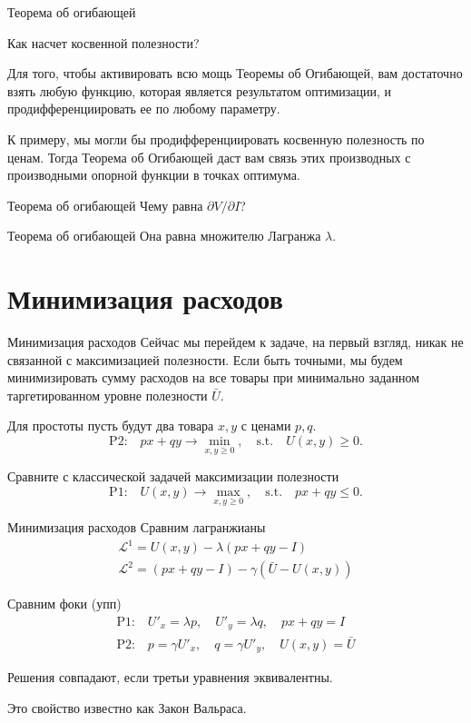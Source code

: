 \documentclass{beamer}
\begin{document}
\begin{frame}{Теорема об огибающей}

Как насчет косвенной полезности?

Для того, чтобы активировать всю мощь Теоремы об Огибающей, вам достаточно взять любую функцию, которая является результатом оптимизации, и продифференциировать ее по любому параметру.

К примеру, мы могли бы продифференциировать косвенную полезность по ценам. Тогда Теорема об Огибающей даст вам связь этих производных с производными опорной функции в точках оптимума.

\end{frame}

\begin{frame}{Теорема об огибающей}
Чему равна $\partial V/ \partial I$?
\end{frame}

\begin{frame}{Теорема об огибающей}
Она равна множителю Лагранжа $\lambda$.
\end{frame}

\section{Минимизация расходов}

\begin{frame}{Минимизация расходов}
Сейчас мы перейдем к задаче, на первый взгляд, никак не связанной с максимизацией полезности. Если быть точными, мы будем минимизировать сумму расходов на все товары при минимально заданном таргетированном уровне полезности $\bar U$. 

Для простоты пусть будут два товара $x, y$ с ценами $p, q$. 
$$\text{P2:} \quad p x + q y \to \min_{x,y \geqslant 0}, \quad \text{s.t.} \quad U(x,y) \geqslant 0.$$

Сравните с классической задачей максимизации полезности
$$\text{P1:} \quad U(x, y) \to \max_{x,y \geqslant 0}, \quad \text{s.t.} \quad p x + q y \leqslant 0.$$
\end{frame}

\begin{frame}{Минимизация расходов}
Сравним лагранжианы
\begin{gather*}
\mathcal{L}^{1} = U(x, y) - \lambda (px + qy - I)\\
\mathcal{L}^{2} = (px + qy - I) - \gamma (\bar U - U(x,y))
\end{gather*}

Сравним фоки (упп)
\begin{gather*}
\text{P1:} \quad U'_x = \lambda p, \quad U'_y = \lambda q, \quad px + qy = I\\
\text{P2:} \quad p = \gamma U'_x, \quad q = \gamma U'_y, \quad U(x,y) = \bar U
\end{gather*}

Решения совпадают, если третьи уравнения эквивалентны.

Это свойство известно как Закон Вальраса.
\end{frame}
\end{document}
